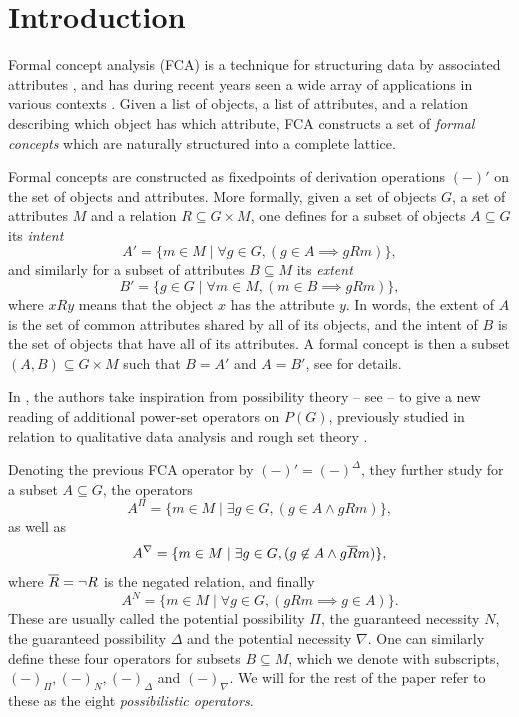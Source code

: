 

\section{Introduction}

Formal concept analysis (FCA) is a technique for structuring data by associated attributes \cite{ganter-wille_1999}, and has during recent years seen a wide array of applications in various contexts \cite{singh-kumar-gani_2016}. Given a list of objects, a list of attributes, and a relation describing which object has which attribute, FCA constructs a set of \emph{formal concepts} which are naturally structured into a complete lattice. 

Formal concepts are constructed as fixedpoints of derivation operations $(-)'$ on the set of objects and attributes. More formally, given a set of objects $G$, a set of attributes $M$ and a relation $R\subseteq G\times M$, one defines for a subset of objects $A\subseteq G$ its \emph{intent}
\[A' = \{m \in M \mid \forall g\in G, (g\in A \implies gRm)\},\]
and similarly for a subset of attributes $B\subseteq M$ its \emph{extent}
\[B' = \{g \in G \mid \forall m \in M, (m\in B \implies gRm)\},\]
where $xRy$ means that the object $x$ has the attribute $y$. In words, the extent of $A$ is the set of common attributes shared by all of its objects, and the intent of $B$ is the set of objects that have all of its attributes. A formal concept is then a subset $(A,B)\subseteq G\times M$ such that $B=A'$ and $A=B'$, see \cite{ganter-wille_1999} for details. 

In \cite{dubois-dupin-prade_2007, dubois-prade_2009}, the authors take inspiration from possibility theory -- see \cite{dubois-prade_1988, dubois-prade_1998, dubois-prade_2015} -- to give a new reading of additional power-set operators on $P(G)$, previously studied in relation to qualitative data analysis \cite{duntsch-gediga_2002} and rough set theory \cite{yao-chen_2006}. 

Denoting the previous FCA operator by $(-)' = (-)^\Delta$, they further study for a subset $A\subseteq G$, the operators 
\[A^\Pi = \{m \in M \mid \exists g\in G, (g\in A \wedge gRm)\},\]
as well as
\[A^\nabla = \{m\in M \mid \exists g\in G, (g\not\in A \wedge g\overline{R} m)\},\]
where $\overline{R} = \neg R$ is the negated relation, and finally
\[A^N = \{m\in M \mid \forall g\in G, (gRm \implies g\in A)\}.\]
These are usually called the potential possibility $\Pi$, the guaranteed necessity $N$, the guaranteed possibility $\Delta$ and the potential necessity $\nabla$. One can similarly define these four operators for subsets $B\subseteq M$, which we denote with subscripts, $(-)_\Pi, (-)_N, (-)_\Delta$ and $(-)_\nabla$. We will for the rest of the paper refer to these as the eight \emph{possibilistic operators}.  


